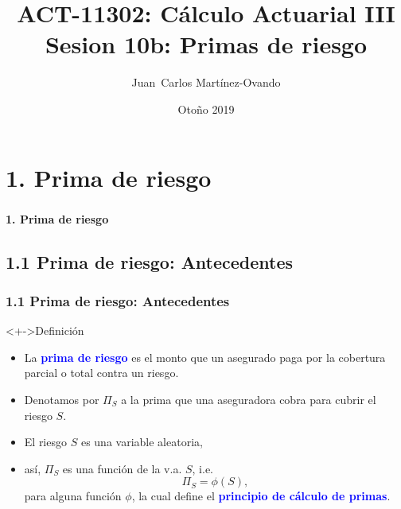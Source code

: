\documentclass[cjk,t,compress]{beamer}
\title[C\'alculo Actuarial III]
{	ACT-11302: C\'alculo Actuarial III\\
	{\large Sesion 10b: Primas de riesgo}
}
\author[Mart\'inez-Ovando]{
{	\footnotesize
	\textcolor{MyDarkGreen}{Juan~Carlos Mart\'inez-Ovando}}
}
\institute[ITAM]
{	\textcolor{MyDarkGrey}{
	ITAM}
}
\date[ ] %
{	\scriptsize
	\textcolor{MyDarkGrey}{Oto\~no 2019}
}
\begin{document}
\sffamily
\begin{frame}[fragile]
	\frametitle{}
	\titlepage
\end{frame}

%
%
\section{1. Prima de riesgo}
\begin{frame}[fragile]
	\frametitle{}
	\vspace{5.5cm}
	\begin{flushright}
		\textcolor{MyDarkBlue}{\Large \bf 1. Prima de riesgo}
	\end{flushright}
\end{frame}

%
%
\subsection{1.1 Prima de riesgo: Antecedentes}
\begin{frame}[fragile]
	\frametitle{1.1 Prima de riesgo: Antecedentes}
	\scriptsize  	
		
		\vspace{0.4cm}
		\begin{block}<+->{Definici\'on}
		\vspace{0.3cm}
		\begin{itemize}
		 \item La \textcolor{blue}{\bf prima de riesgo} es el monto que un asegurado paga por la cobertura parcial o total contra un riesgo.
		
		 \item Denotamos por $\Pi_S$ a la prima que una aseguradora cobra para cubrir el riesgo $S$.
		 \item El riesgo $S$ es una variable aleatoria,
		 
		 \item[] as\'i, $\Pi_S$ es una funci\'on de la v.a. $S$, i.e.
		\begin{equation}
			\Pi_S=\phi(S),
			\nonumber
		\end{equation}
		para alguna funci\'on $\phi$, la cual define el \textcolor{blue}{\bf principio de c\'alculo de primas}.
		\end{itemize}
		\end{block}  		
				
\end{frame}
\end{document}
